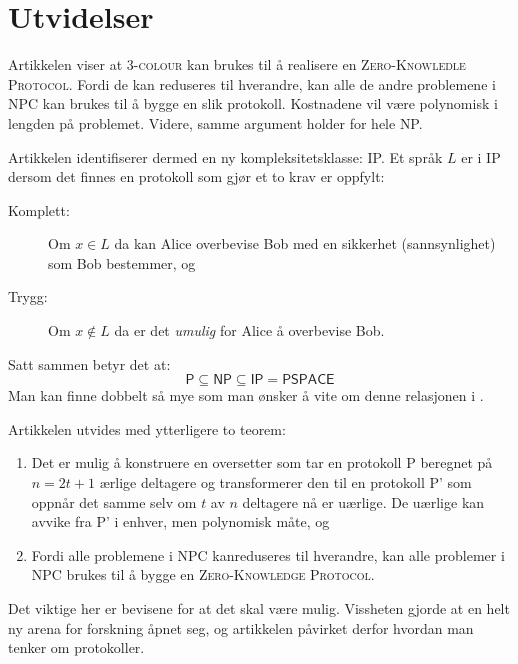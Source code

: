 \documentclass[a4paper, parskip=half]{scrartcl}
\theoremstyle{definition}
\begin{document}
%
%

\section{Utvidelser}
\label{sec:utvidelser}

Artikkelen viser at \textsc{3-colour} kan brukes til å realisere en
\textsc{Zero-Knowledle Protocol}.  Fordi de kan reduseres til
hverandre, kan alle de andre problemene i \textsf{NPC} kan brukes
til å bygge en slik protokoll.  Kostnadene vil være polynomisk i
lengden på problemet.  Videre, samme argument holder for hele
\textsf{NP}. 

Artikkelen identifiserer dermed en ny kompleksitetsklasse:
\textsf{IP}.  Et språk $L$ er i \textsf{IP} dersom det finnes en
protokoll som gjør et to krav er oppfylt:
\begin{description}
\item [Komplett:] Om $x \in L$ da kan Alice overbevise Bob med en
  sikkerhet (sannsynlighet) som Bob bestemmer, og
\item [Trygg:] Om $x \not\in L$ da er det \emph{umulig} for Alice å
  overbevise Bob. 
\end{description}

Satt sammen betyr det at:
\begin{equation*}
\textsf{P}\subseteq \textsf{NP}\subseteq \textsf{IP}=\textsf{PSPACE}  
\end{equation*}
Man kan finne dobbelt så mye som man ønsker å vite om denne relasjonen
i \cite[kapittel 12.2]{papadimitriou1994computational}.

Artikkelen utvides med ytterligere to teorem:
\begin{enumerate}
\item Det er mulig å konstruere en oversetter som tar en protokoll
  \textsc{P} beregnet på $n=2t+1$ ærlige deltagere og transformerer
  den til en protokoll \textsc{P'} som oppnår det samme selv om $t$ av
  $n$ deltagere nå er uærlige.  De uærlige kan avvike fra \textsc{P'}
  i enhver, men polynomisk måte, og
\item Fordi alle problemene i \textsf{NPC} kanreduseres til hverandre,
  kan alle problemer i \textsf{NPC} brukes til å bygge en
  \textsc{Zero-Knowledge Protocol}.
\end{enumerate}
Det viktige her er bevisene for at det skal være mulig.  Vissheten
gjorde at en helt ny arena for forskning åpnet seg, og artikkelen
påvirket derfor hvordan man tenker om protokoller.



\end{document}
